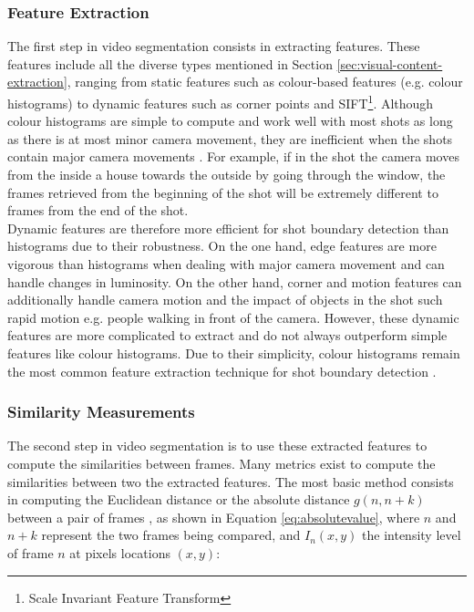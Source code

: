 \subsubsection{Feature Extraction}
\label{sec:feature-extraction-sbd}
The first step in video segmentation consists in extracting features. These features include all the diverse types mentioned in Section \ref{sec:visual-content-extraction}, ranging from static features such as colour-based features (e.g. colour histograms) \cite{hoi2006trecvid06} to dynamic features such as corner points and SIFT\footnote{Scale Invariant Feature Transform}. Although colour histograms are simple to compute and work well with most shots as long as there is at most minor camera movement, they are inefficient when the shots contain major camera movements \cite{hu2011survey}. For example, if in the shot the camera moves from the inside a house towards the outside by going through the window, the frames retrieved from the beginning of the shot will be extremely different to frames from the end of the shot.\\

Dynamic features are therefore more efficient for shot boundary detection than histograms due to their robustness. On the one hand, edge features are more vigorous than histograms when dealing with major camera movement and can handle changes in luminosity. On the other hand, corner and motion features can additionally handle camera motion and the impact of objects in the shot such rapid motion e.g. people walking in front of the camera. However, these dynamic features are more complicated to extract and do not always outperform simple features like colour histograms. Due to their simplicity, colour histograms remain the most common feature extraction technique for shot boundary detection \cite{yuan2007shotboundary}.\\

\subsubsection{Similarity Measurements}
\label{sec:similarity-measurements-sbd}
The second step in video segmentation is to use these extracted features to compute the similarities between frames. Many metrics exist to compute the similarities between two the extracted features. The most basic method consists in computing the Euclidean distance or the absolute distance $g(n,n+k)$ between a pair of frames \cite[p.476]{janwe2013video}, as shown in Equation \ref{eq:absolutevalue}, where $n$ and $n+k$ represent the two frames being compared, and $I_n(x,y)$ the intensity level of frame $n$ at pixels locations $(x,y)$:

